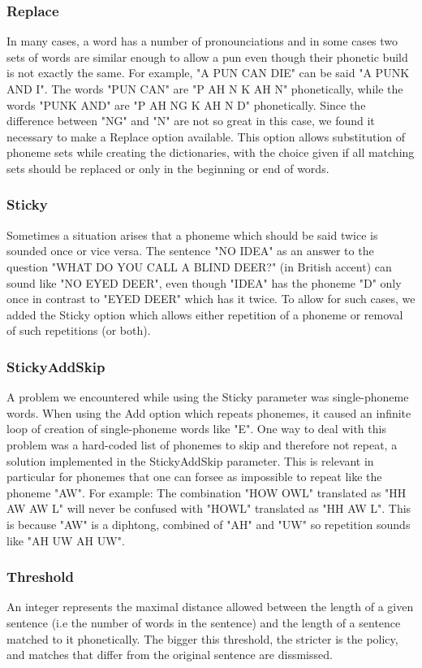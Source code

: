 \documentclass[11pt,a4paper]{article}
\begin{document}
\subsubsection{Replace}
In many cases, a word has a number of pronounciations and in some cases two sets of words are similar enough to allow a pun even though their phonetic build is not exactly the same. For example, "A PUN CAN DIE" can be said "A PUNK AND I". The words "PUN CAN" are "P AH N K AH N" phonetically, while the words "PUNK AND" are "P AH NG K AH N D" phonetically. Since the difference between "NG" and "N" are not so great in this case, we found it necessary to make a Replace option available. This option allows substitution of phoneme sets while creating the dictionaries, with the choice given if all matching sets should be replaced or only in the beginning or end of words.

\subsubsection{Sticky}
Sometimes a situation arises that a phoneme which should be said twice is sounded once or vice versa. The sentence "NO IDEA" as an answer to the question "WHAT DO YOU CALL A BLIND DEER?" (in British accent) can sound like "NO EYED DEER", even though "IDEA" has the phoneme "D" only once in contrast to "EYED DEER" which has it twice. To allow for such cases, we added the Sticky option which allows either repetition of a phoneme or removal of such repetitions (or both).

\subsubsection{StickyAddSkip}
A problem we encountered while using the Sticky parameter was single-phoneme words. When using the Add option which repeats phonemes, it caused an infinite loop of creation of single-phoneme words like "E". One way to deal with this problem was a hard-coded list of phonemes to skip and therefore not repeat, a solution implemented in the StickyAddSkip parameter. This is relevant in particular for phonemes that one can forsee as impossible to repeat like the phoneme "AW". For example: The combination "HOW OWL" translated as "HH AW AW L" will never be confused with "HOWL" translated as "HH AW L". This is because "AW" is a diphtong, combined of "AH" and "UW" so repetition sounds like "AH UW AH UW".

\subsubsection{Threshold}
An integer represents the maximal distance allowed between the length of a given sentence (i.e the number of words in the sentence) and the length of a sentence matched to it phonetically. The bigger this threshold, the stricter is the policy, and matches that differ from the original sentence are dissmissed.
\end{document}
